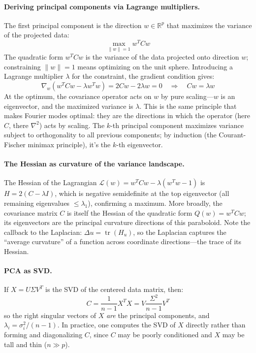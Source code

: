 \documentclass[12pt,a4paper]{report}
\DeclareMathOperator{\tr}{tr}
\theoremstyle{thms}
\theoremstyle{defns}
\begin{document}
\paragraph{Deriving principal components via Lagrange multipliers.} The first principal component is the direction $w \in \mathbb{R}^p$ that maximizes the variance of the projected data:
\begin{equation}
    \max_{\|w\| = 1} w^T C w
\end{equation}
The quadratic form $w^TCw$ is the variance of the data projected onto direction $w$; constraining $\|w\| = 1$ means optimizing on the unit sphere. Introducing a Lagrange multiplier $\lambda$ for the constraint, the gradient condition gives:
\begin{equation}
    \nabla_w(w^TCw - \lambda w^Tw) = 2Cw - 2\lambda w = 0 \quad \Longrightarrow \quad Cw = \lambda w
\end{equation}
At the optimum, the covariance operator acts on $w$ by pure scaling—$w$ is an eigenvector, and the maximized variance is $\lambda$. This is the same principle that makes Fourier modes optimal: they are the directions in which the operator (here $C$, there $\nabla^2$) acts by scaling. The $k$-th principal component maximizes variance subject to orthogonality to all previous components; by induction (the Courant-Fischer minimax principle), it's the $k$-th eigenvector.

\paragraph{The Hessian as curvature of the variance landscape.} The Hessian of the Lagrangian $\mathcal{L}(w) = w^TCw - \lambda(w^Tw - 1)$ is $H = 2(C - \lambda I)$, which is negative semidefinite at the top eigenvector (all remaining eigenvalues $\leq \lambda_1$), confirming a maximum. More broadly, the covariance matrix $C$ is itself the Hessian of the quadratic form $Q(w) = w^TCw$; its eigenvectors are the principal curvature directions of this paraboloid. Note the callback to the Laplacian: $\Delta u = \tr(H_u)$, so the Laplacian captures the ``average curvature'' of a function across coordinate directions—the trace of its Hessian.

\paragraph{PCA as SVD.} If $X = U\Sigma V^T$ is the SVD of the centered data matrix, then:
\begin{equation}
    C = \dfrac{1}{n-1}X^TX = V\dfrac{\Sigma^2}{n-1}V^T
\end{equation}
so the right singular vectors of $X$ \textit{are} the principal components, and $\lambda_i = \sigma_i^2 / (n - 1)$. In practice, one computes the SVD of $X$ directly rather than forming and diagonalizing $C$, since $C$ may be poorly conditioned and $X$ may be tall and thin ($n \gg p$).
\end{document}
